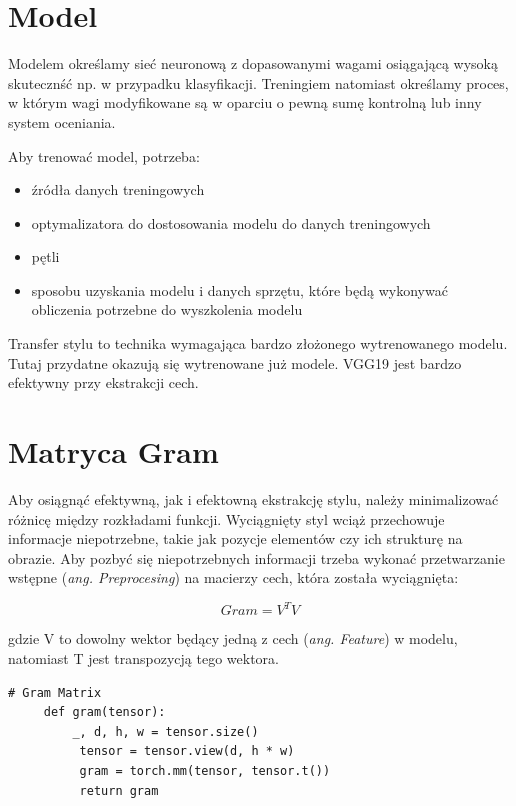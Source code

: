 \documentclass[openright]{xmgr}
\begin{document}
\section{Model\label{s:dsssl}}
  \indent \indent Modelem określamy sieć neuronową z dopasowanymi wagami osiągającą wysoką skutecznść np. w przypadku klasyfikacji. Treningiem natomiast określamy proces, w którym wagi modyfikowane są w oparciu o pewną sumę kontrolną lub inny system oceniania.

Aby trenować model, potrzeba:

\begin{itemize}
\item źródła danych treningowych
\item optymalizatora do dostosowania modelu do danych treningowych 
\item pętli  
\item sposobu uzyskania modelu i danych sprzętu, które będą wykonywać obliczenia potrzebne do wyszkolenia modelu

\end{itemize}

Transfer stylu to technika wymagająca bardzo złożonego wytrenowanego modelu. Tutaj przydatne okazują się wytrenowane już modele. VGG19 jest bardzo efektywny przy ekstrakcji cech.

\section{Matryca Gram\label{s:dsssl}}
  \indent \indent Aby osiągnąć efektywną, jak i efektowną ekstrakcję stylu, należy minimalizować różnicę między rozkładami funkcji. Wyciągnięty styl wciąż przechowuje informacje niepotrzebne, takie jak pozycje elementów czy ich strukturę na obrazie. Aby pozbyć się niepotrzebnych informacji trzeba wykonać przetwarzanie wstępne (\textit{ang. Preprocesing}) na macierzy cech, która została wyciągnięta:

\begin{equation}
Gram = V^TV
\end{equation}

gdzie V to dowolny wektor będący jedną z cech (\textit{ang. Feature}) w modelu, natomiast T jest transpozycją tego wektora. 
\begin{lstlisting}
# Gram Matrix
	 def gram(tensor):
	 	 _, d, h, w = tensor.size()
          tensor = tensor.view(d, h * w)
          gram = torch.mm(tensor, tensor.t())
          return gram
\end{lstlisting}
\end{document}
